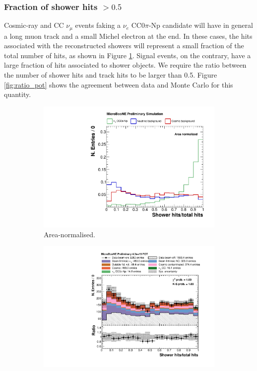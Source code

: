 \subsubsection*{Fraction of shower hits $> 0.5$}
Cosmic-ray and CC $\nu_{\mu}$ events faking a $\nu_{e}$ CC0$\pi$-Np candidate will have in general a long muon track and a small Michel electron at the end. In these cases, the hits associated with the reconstructed showers will represent a small fraction of the total number of hits, as shown in Figure \ref{fig:ratio_norm}. Signal events, on the contrary, have a large fraction of hits associated to shower objects. We require the ratio between the number of shower hits and track hits to be larger than 0.5. Figure \ref{fig:ratio_pot} shows the agreement between data and Monte Carlo for this quantity.

\begin{figure}[htbp]
\centering
  \begin{subfigure}{0.49\textwidth}
    \includegraphics[width=\linewidth]{figures/h_hits_ratio_norm.pdf}
    \caption{Area-normalised.} \label{fig:ratio_norm}
  \end{subfigure}
    \begin{subfigure}{0.49\textwidth}
    \includegraphics[width=\linewidth]{figures/h_hits_ratio.pdf}

\end{subfigure}
\end{figure}

